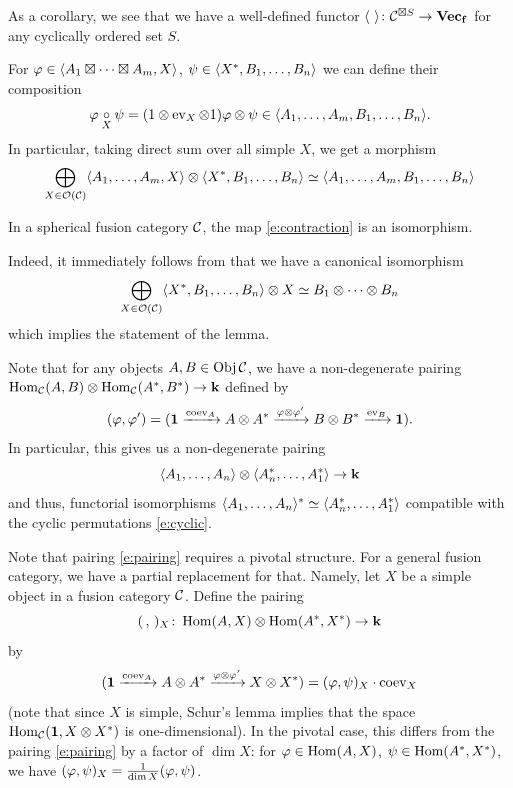 As a corollary, we see that we have a well-defined functor
$\langle\ \rangle\colon \mathcal{C}^{\boxtimes S}\to \mathbf{Vec_f}$ for any cyclically ordered set $S$.


For $\varphi\in \langle A_1\boxtimes\dots\boxtimes A_m, X\rangle$,
$\psi \in \langle X^*, B_1, \dots, B_n\rangle$ we can define their composition
\begin{equation}\label{e:composition}
  \varphi\underset{\scriptstyle X}{\circ} \psi =(1\otimes\operatorname{ev}_X\otimes 1)\varphi\otimes \psi\in
  \langle A_1, \dots, A_m, B_1, \dots, B_n\rangle.
\end{equation}
In particular, taking direct sum over all simple $X$, we get a morphism
\begin{equation}\label{e:contraction}
  \bigoplus_{X\in \mathcal{O}(\mathcal{C})}\langle A_1, \dots, A_m, X\rangle\otimes \langle X^*, B_1, \dots, B_n\rangle
   \simeq \langle A_1, \dots, A_m, B_1, \dots, B_n\rangle
\end{equation}


\begin{lemma}\label{l:contraction}
  In a spherical fusion category $\mathcal{C}$, the map \eqref{e:contraction} is an
  isomorphism.
\end{lemma}
Indeed, it immediately follows from  that we have a canonical
isomorphism
$$
  \bigoplus_{X\in\mathcal{O}(\mathcal{C})} \langle X^*, B_1, \dots, B_n\rangle\otimes X
  \simeq B_1\otimes \dots\otimes B_n
$$
which implies the statement of the lemma.

Note that for any objects $A,B\in \operatorname{Obj} \mathcal{C}$, we have a
non-degenerate pairing $\operatorname{Hom}_{\mathcal{C}}(A,B)\otimes \operatorname{Hom}_{\mathcal{C}}(A^*,B^*)\to \mathbf{k}$
defined by
\begin{equation}\label{e:pairing}
(\varphi, \varphi')=(\mathbf{1}\xrightarrow{\operatorname{coev}_A}A\otimes A^*\xrightarrow{\varphi\otimes \varphi'}
  B\otimes B^*\xrightarrow{\operatorname{ev}_B}\mathbf{1}).
\end{equation}
In particular, this gives us a non-degenerate pairing
\begin{equation}\label{e:dual}
\langle A_1,\dots,A_n\rangle\otimes \langle A_n^*,\dots,A_1^*\rangle\to \mathbf{k}
\end{equation}
and thus, functorial isomorphisms $\langle A_1,\dots,A_n\rangle^*\simeq
\langle A_n^*,\dots,A_1^*\rangle$ compatible with the cyclic permutations
\eqref{e:cyclic}.

\begin{remark}\label{r:pairing-nonpivotal}
  Note that pairing \eqref{e:pairing} requires a pivotal structure. For a
  general fusion category, we have a partial replacement for that. Namely, let
  $X$ be a simple object in a fusion category $\mathcal{C}$. Define the pairing
  \begin{equation}\label{e:pairing2}
  (\, , \,)_X\colon \operatorname{Hom}(A,X)\otimes \operatorname{Hom}(A^*, X^*)\to \mathbf{k}
  \end{equation}
  by
  $$
    (\mathbf{1}\xrightarrow{\operatorname{coev}_A}A\otimes A^*\xrightarrow{\varphi\otimes \varphi'}X\otimes X^*)
    = (\varphi, \psi)_X \cdot \operatorname{coev}_X
  $$
  (note that since $X$ is simple, Schur's lemma implies that the space
  $\operatorname{Hom}_{\mathcal{C}}(\mathbf{1}, X\otimes X^*)$ is one-dimensional). In the pivotal case,
  this differs from the pairing \eqref{e:pairing} by a factor of $\dim X$:
  for $\varphi\in \operatorname{Hom}(A,X)$, $\psi\in\operatorname{Hom}(A^*,X^*)$, we have
  $(\varphi,\psi)_X=\frac{1}{\dim X} (\varphi,\psi)$.
\end{remark}
